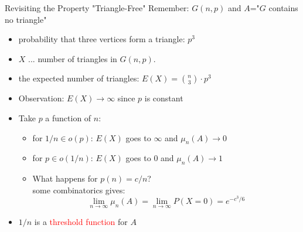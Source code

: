 \documentclass[handout]{beamer}
\renewcommand{\emph}[1]{\textcolor{red}{#1}}
\begin{document}
\begin{frame}{Revisiting the Property "Triangle-Free"}
  Remember: $G(n,p)$ and $A$="$G$ contains no triangle"
  \pause
  \begin{itemize}
    \item probability that three vertices form a triangle: $p^3$
    \pause
    \item $X$ ... number of triangles in $G(n,p)$.
    \item the expected number of triangles: $E(X)={n \choose 3}\cdot p^3$
    \pause
    \item Observation: $E(X)\rightarrow\infty$ since $p$ is constant
    \item Take $p$ a function of $n$:  
	\begin{itemize}
	  \item for $1/n\in o(p)$: $E(X)$ goes to $\infty$ and $\mu_n(A)\rightarrow 0$
	  \pause
	  \item for $p\in o(1/n)$: $E(X)$ goes to $0$ and $\mu_n(A)\rightarrow 1$
          \pause
          \item What happens for $p(n)=c/n$? \pause\\some combinatorics gives: 
      $$\lim_{n\rightarrow\infty}\mu_n(A)=\lim_{n\rightarrow\infty}P(X=0)=e^{-c^3/6}$$
  	\end{itemize}
    \item $1/n$ is a \emph{threshold function} for $A$
  \end{itemize}
\end{frame}
\end{document}
